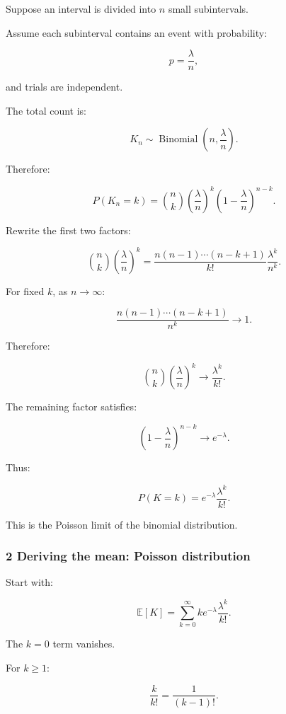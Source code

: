 \hypertarget{02-foundations-ii-ch024-derivation-as-a-limit-of-binomial-distributions}{}

Suppose an interval is divided into \(n\) small subintervals.

Assume each subinterval contains an event with probability:

\[
 p=\frac\lambda n,
\]

and trials are independent.

The total count is:

\[
 K_n\sim\operatorname{Binomial} \left(n,\frac\lambda n\right).
\]

Therefore:

\[
 P(K_n=k) = \binom nk \left(\frac\lambda n\right)^k \left(1-\frac\lambda n\right)^{n-k}.
\]

Rewrite the first two factors:

\[
 \binom nk\left(\frac\lambda n\right)^k = \frac{n(n-1)\cdots(n-k+1)}{k!} \frac{\lambda^k}{n^k}.
\]

For fixed \(k\), as \(n\to\infty\):

\[
 \frac{n(n-1)\cdots(n-k+1)}{n^k} \to1.
\]

Therefore:

\[
 \binom nk\left(\frac\lambda n\right)^k \to \frac{\lambda^k}{k!}.
\]

The remaining factor satisfies:

\[
 \left(1-\frac\lambda n\right)^{n-k} \to e^{-\lambda}.
\]

Thus:

\[
 \boxed{ P(K=k)=e^{-\lambda}\frac{\lambda^k}{k!} }.
\]

This is the Poisson limit of the binomial distribution.

\subsubsection{2 Deriving the mean: Poisson distribution}\label{02-foundations-ii-ch024-deriving-the-mean-poisson-distribution}

\hypertarget{02-foundations-ii-ch024-deriving-the-mean-poisson-distribution}{}

Start with:

\[
 \mathbb E[K] = \sum_{k=0}^\infty k e^{-\lambda}\frac{\lambda^k}{k!}.
\]

The \(k=0\) term vanishes.

For \(k\ge1\):

\[
 \frac{k}{k!}=\frac1{(k-1)!}.
\]

